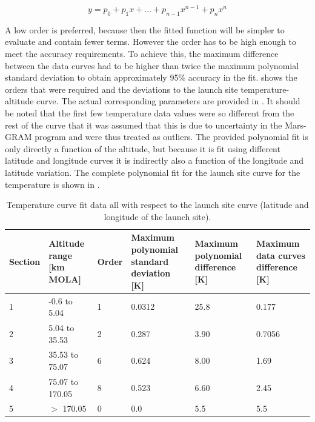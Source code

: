 \begin{equation} \label{eq:polyGenFunct}
y= p_{0}+p_{1}x+\dots+p_{n-1}x^{n-1}+p_{n}x^{n}
\end{equation}

\noindent
A low order is preferred, because then the fitted function will be simpler to evaluate and contain fewer terms. However the order has to be high enough to meet the accuracy requirements. To achieve this, the maximum difference between the data curves had to be higher than twice the maximum polynomial standard deviation to obtain approximately 95\% accuracy in the fit.  shows the orders that were required and the deviations to the launch site temperature-altitude curve. The actual corresponding parameters are provided in . It should be noted that the first few temperature data values were so different from the rest of the curve that it was assumed that this is due to uncertainty in the Mars-\ac{GRAM} program and were thus treated as outliers. The provided polynomial fit is only directly a function of the altitude, but because it is fit using different latitude and longitude curves it is indirectly also a function of the longitude and latitude variation. The complete polynomial fit for the launch site curve for the temperature is shown in .

\begin{table}[H]
\begin{center}
\caption{Temperature curve fit data all with respect to the launch site curve (latitude and longitude of the launch site).}
\label{tab:fitDeviations}
\begin{tabularx}{1.0\textwidth}{|l|p{2.2cm}|l|X|X|X|}
\hline 
\small \textbf{Section} & \small \textbf{Altitude range [km MOLA]} & \small \textbf{Order}	& \small \textbf{Maximum polynomial standard deviation [K]} & \small \textbf{Maximum polynomial difference [K]} & \small \textbf{Maximum data curves difference [K]} \\ \hline 
1 & -0.6 to 5.04 & 1 & 0.0312 & 25.8 & 0.177 \\ \hline
2 & 5.04 to 35.53 & 2 & 0.287 & 3.90 & 0.7056 \\ \hline
3 & 35.53 to 75.07 & 6 & 0.624 & 8.00 & 1.69 \\ \hline
4 & 75.07 to 170.05 & 8 & 0.523 & 6.60 & 2.45 \\ \hline
5 & $>$ 170.05 & 0 & 0.0 & 5.5 & 5.5 \\ \hline
\end{tabularx}
\end{center}
\end{table}


